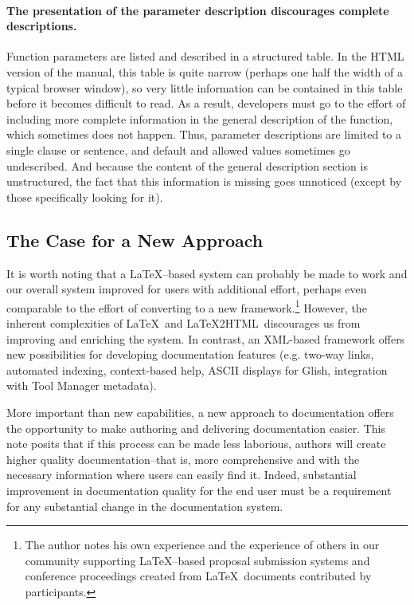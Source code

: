 \paragraph{The presentation of the parameter description discourages
complete descriptions.}  Function parameters are listed and described in a
structured table.  In the HTML version of the manual, this table is
quite narrow (perhaps one half the width of a typical browser
window), so very little information can be contained in this table
before it becomes difficult to read.  As a result, developers must go
to the effort of including more complete information in the general
description of the function, which sometimes does not happen.
Thus, parameter descriptions are limited to a single clause or
sentence, and default and allowed values sometimes go undescribed.
And because the content of the general description section is
unstructured, the fact that this information is missing goes unnoticed
(except by those specifically looking for it).  

\subsection{The Case for a New Approach} 

It is worth noting that a \LaTeX--based system can probably be made to
work and our overall system improved for users with additional effort,
perhaps even comparable to the effort of converting to a new
framework.\footnote{The author notes his own experience and the
experience of others in our community supporting \LaTeX--based
proposal submission systems and conference proceedings created from
\LaTeX\ documents contributed by participants.}  However, the inherent
complexities of \LaTeX\ and \LaTeX2HTML\ discourages us from improving
and enriching the system.  In contrast, an XML-based framework offers
new possibilities for developing documentation features
(e.g. two-way links, automated indexing, context-based help, ASCII
displays for Glish, integration with Tool Manager metadata).  

More important than new capabilities, a new approach to documentation
offers the opportunity to make authoring and delivering
documentation easier.  This note posits that if this process can be
made less laborious, authors will create higher quality
documentation--that is, more comprehensive and with the necessary
information where users can easily find it.  Indeed, substantial
improvement in documentation quality for the end user must be a
requirement for any substantial change in the documentation system.  

